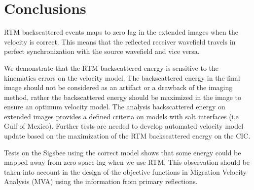 \section{Conclusions}

RTM backscattered events maps to zero lag in the extended images when the
velocity is correct. This means that the reflected
receiver wavefield travels in perfect synchronization with the source wavefield and
vice versa.

We demonstrate that the RTM backscattered energy is sensitive to the kinematics errors
on the velocity model. The backscattered energy in the final image should not be considered 
as an artifact or a drawback of the imaging method, rather the backscattered energy
 should be maximized in the image to ensure an optimum velocity 
model. The analysis backscattered energy on extended images provides a defined criteria on models with
salt interfaces (i.e Gulf of Mexico).
 Further tests are needed to develop automated velocity model update based on the maximization of 
the RTM backscattered energy on the CIC.

Tests on the Sigsbee using the correct model shows that some energy could be mapped away from zero space-lag when
we use RTM. This observation should be taken into account in the design of the objective 
functions in Migration Velocity Analysis (MVA) using the information from primary reflections.
